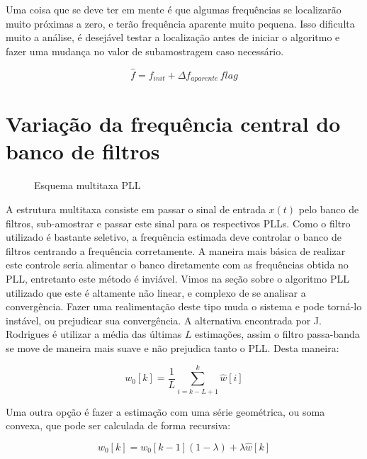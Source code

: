 \indent Uma coisa que se deve ter em mente é que algumas frequências se localizarão muito próximas a zero, e terão frequência aparente muito pequena. Isso dificulta muito a análise, é desejável testar a localização antes de iniciar o algoritmo e fazer uma mudança no valor de subamostragem caso necessário.

\begin{equation}
\hat{f}=f_{init}+\Delta f_{aparente}\, flag
\end{equation}

\section{Variação da frequência central do banco de filtros}

\begin{figure}[h]
	\centering    
	\def\svgscale{0.7}
	
	\caption{Esquema multitaxa PLL}
	\label{fig:esquema_pll}
\end{figure}

\indent A estrutura multitaxa consiste em passar o sinal de entrada $x(t)$ pelo banco de filtros, sub-amostrar e passar este sinal para os respectivos PLLs. Como o filtro utilizado é bastante seletivo, a frequência estimada deve controlar o banco de filtros centrando a frequência corretamente. A maneira mais básica de realizar este controle seria alimentar o banco diretamente com as frequências obtida no PLL, entretanto este método é inviável. Vimos na seção sobre o algoritmo PLL utilizado que este é altamente não linear, e complexo de se analisar a convergência. Fazer uma realimentação deste tipo muda o sistema e pode torná-lo instável, ou prejudicar sua convergência. A alternativa encontrada por J. Rodrigues \cite{carvalho2008estimaccao}  é utilizar a média das últimas $L$ estimações, assim o filtro passa-banda se move de maneira mais suave e não prejudica tanto o PLL. Desta maneira:
   
\begin{equation}
w_0[k]=\frac{1}{L} \sum_{i=k-L+1}^{k}\hat{w}[i]
\end{equation}

\indent Uma outra opção é fazer a estimação com uma série geométrica, ou soma convexa, que pode ser calculada de forma recursiva:
 
\begin{equation}
w_{0}[k]=w_{0}[k-1](1-\lambda) + \lambda \hat{w}[k]
\label{eq:w0 filtro}
\end{equation}

